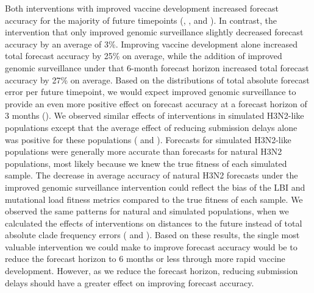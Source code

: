 \documentclass[9pt,lineno]{elife}
\begin{document}
Both interventions with improved vaccine development increased forecast accuracy for the majority of future timepoints (, , and ).
In contrast, the intervention that only improved genomic surveillance slightly decreased forecast accuracy by an average of 3\%.
Improving vaccine development alone increased total forecast accuracy by 25\% on average, while the addition of improved genomic surveillance under that 6-month forecast horizon increased total forecast accuracy by 27\% on average.
Based on the distributions of total absolute forecast error per future timepoint, we would expect improved genomic surveillance to provide an even more positive effect on forecast accuracy at a forecast horizon of 3 months ().
We observed similar effects of interventions in simulated H3N2-like populations except that the average effect of reducing submission delays alone was positive for these populations ( and ).
Forecasts for simulated H3N2-like populations were generally more accurate than forecasts for natural H3N2 populations, most likely because we knew the true fitness of each simulated sample.
The decrease in average accuracy of natural H3N2 forecasts under the improved genomic surveillance intervention could reflect the bias of the LBI and mutational load fitness metrics compared to the true fitness of each sample.
We observed the same patterns for natural and simulated populations, when we calculated the effects of interventions on distances to the future instead of total absolute clade frequency errors ( and ).
Based on these results, the single most valuable intervention we could make to improve forecast accuracy would be to reduce the forecast horizon to 6 months or less through more rapid vaccine development.
However, as we reduce the forecast horizon, reducing submission delays should have a greater effect on improving forecast accuracy.
\end{document}
